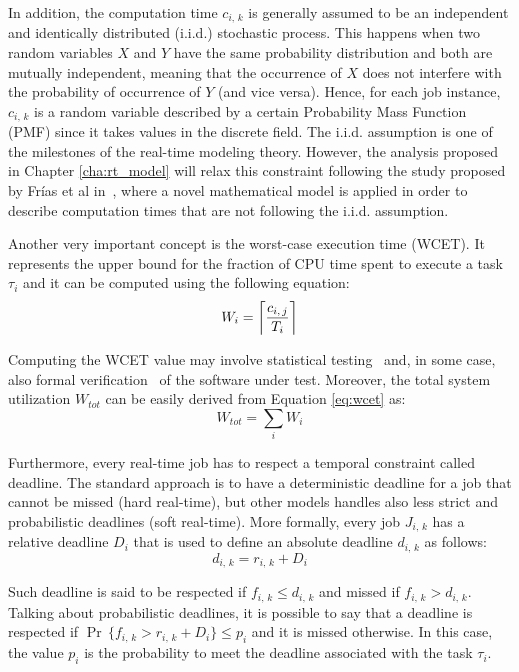 In addition, the computation time \( c_{i,\,k} \) is generally assumed to be an
independent and identically distributed (i.i.d.) stochastic process.
This happens when two random variables \( X \) and \( Y \) have 
the same probability distribution and both are mutually
independent, meaning that the occurrence of \( X \) does not interfere with 
the probability of occurrence of \( Y \) (and vice versa).
Hence, for each job instance, \( c_{i,\,k} \) is a random
variable described by a certain Probability Mass Function (PMF) since it
takes values in the discrete field.
The i.i.d. assumption is one of the milestones of the real-time modeling theory.
However, the analysis proposed in Chapter \ref{cha:rt_model} will relax this 
constraint following the study proposed by Fr\'{i}as et al
in~\cite{frias2017probabilistic}, where a novel mathematical model is applied
in order to describe computation times that are not following the i.i.d.
assumption.

Another very important concept is the worst-case execution time (WCET).
It represents the upper bound for the fraction of CPU time spent to execute a task
\( \tau_{i} \) and it can be computed using the following equation:
\begin{equation}\label{eq:wcet}
    W_{i} = \ceil[\bigg]{\frac{c_{i,\,j}}{T_{i}}}
\end{equation}

Computing the WCET value may involve statistical testing~\cite{bernat2002wcet}
and, in some case, also formal verification~\cite{souyris2009formal} of the
software under test.
Moreover, the total system utilization \( W_{tot} \) can be easily derived from
Equation \ref{eq:wcet} as:
\begin{equation}\label{eq:system_utilization}
    W_{tot} = \displaystyle\sum_{i} W_{i}
\end{equation}

Furthermore, every real-time job has to respect a temporal constraint called
deadline. The standard approach is to have a deterministic deadline for a job
that cannot be missed (hard real-time), but other models handles also
less strict and probabilistic deadlines (soft real-time).
More formally, every job \( J_{i,\,k} \) has a relative deadline \( D_{i} \) that
is used to define an absolute deadline \( d_{i,\,k} \) as follows:
\begin{equation}
    d_{i,\,k} = r_{i,\,k} + D_{i}
\end{equation}

Such deadline is said to be respected if \( f_{i,\,k} \leq d_{i,\,k} \) and missed
if \( f_{i,\,k} > d_{i,\,k} \). Talking about probabilistic deadlines, it is
possible to say that a deadline is respected if 
\( \Pr\,\{f_{i,\,k} > r_{i,\,k} + D_{i} \} \leq p_{i} \) and it is missed otherwise.
In this case, the value \( p_{i} \) is the probability to meet the deadline associated
with the task \( \tau_{i} \).


